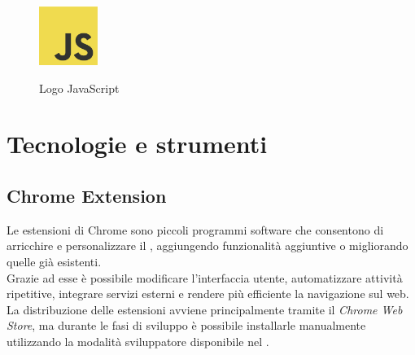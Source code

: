 \begin{figure}[H]
    \centering
    \includegraphics[width=0.17\textwidth, alt={Logo JS}]{img/javascript.png}
    \caption[Logo JavaScript]{Logo JavaScript}\label{fig:logo_JS}
\end{figure}

\section{Tecnologie e strumenti}
\subsection{Chrome Extension}
\label{subsec:chromeExt}
\noindent Le estensioni di Chrome sono piccoli programmi software che consentono di arricchire e personalizzare il , aggiungendo funzionalità aggiuntive o migliorando quelle già esistenti.\\
Grazie ad esse è possibile modificare l’interfaccia utente, automatizzare attività ripetitive, integrare servizi esterni e rendere più efficiente la navigazione sul web.\\ 
La distribuzione delle estensioni avviene principalmente tramite il \textit{Chrome Web Store}, ma durante le fasi di sviluppo è possibile installarle manualmente utilizzando la modalità sviluppatore disponibile nel .

